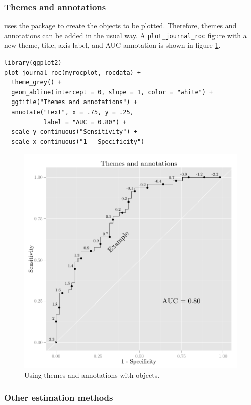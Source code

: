 \documentclass[article]{jss}
\begin{document}
\subsubsection{Themes and annotations}\label{themes-and-annotations}

 uses the  package to create the objects to be
plotted. Therefore, themes and annotations can be added in the usual
 way. A \texttt{plot\_journal\_roc} figure with a new
theme, title, axis label, and AUC annotation is shown in figure
\ref{annotate}.

\begin{verbatim}
library(ggplot2)
plot_journal_roc(myrocplot, rocdata) + 
  theme_grey() + 
  geom_abline(intercept = 0, slope = 1, color = "white") + 
  ggtitle("Themes and annotations") + 
  annotate("text", x = .75, y = .25, 
           label = "AUC = 0.80") + 
  scale_y_continuous("Sensitivity") + 
  scale_x_continuous("1 - Specificity")
\end{verbatim}

\begin{figure}[htbp]
\centering
\includegraphics{figure/print2-1.pdf}
\caption{Using  themes and annotations with 
objects. \label{annotate}}
\end{figure}

\subsubsection{Other estimation methods}\label{other-estimation-methods}
\end{document}
